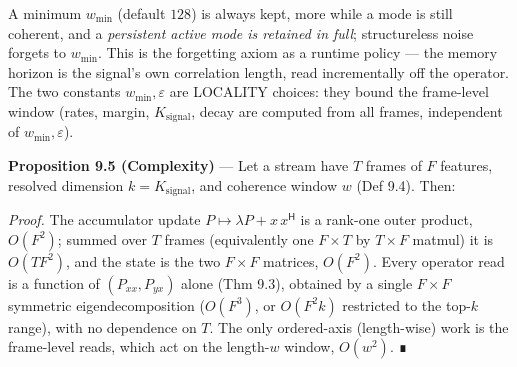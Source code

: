 \documentclass[10pt,letterpaper,twocolumn]{article}
\begin{document}
A minimum \(w_{\min}\) (default \(128\)) is always kept, more while a mode is still coherent, and a \emph{persistent active mode is retained in full}; structureless noise forgets to \(w_{\min}\). This is the forgetting axiom as a runtime policy --- the memory horizon is the signal's own correlation length, read incrementally off the operator. The two constants \(w_{\min},\varepsilon\) are LOCALITY choices: they bound the frame-level window (rates, margin, \(K_{\mathrm{signal}}\), decay are computed from all frames, independent of \(w_{\min},\varepsilon\)).

\textbf{Proposition 9.5 (Complexity)} --- Let a stream have \(T\) frames of \(F\) features, resolved dimension \(k=K_{\mathrm{signal}}\), and coherence window \(w\) (Def 9.4). Then:


\emph{Proof.} The accumulator update \(P\mapsto \lambda P + x\,x^{\mathsf H}\) is a rank-one outer product, \(O(F^2)\); summed over \(T\) frames (equivalently one \(F\times T\) by \(T\times F\) matmul) it is \(O(TF^2)\), and the state is the two \(F\times F\) matrices, \(O(F^2)\). Every operator read is a function of \((P_{xx},P_{yx})\) alone (Thm 9.3), obtained by a single \(F\times F\) symmetric eigendecomposition (\(O(F^3)\), or \(O(F^2k)\) restricted to the top-\(k\) range), with no dependence on \(T\). The only ordered-axis (length-wise) work is the frame-level reads, which act on the length-\(w\) window, \(O(w^2)\). ∎
\end{document}
